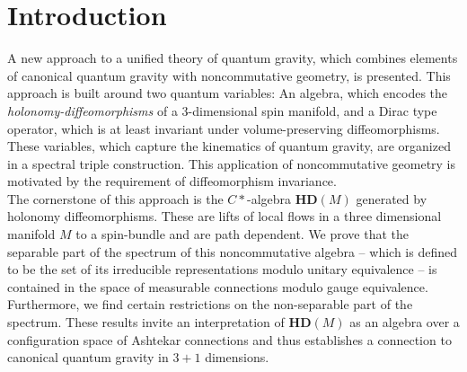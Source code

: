 \documentclass[12pt]{article}
\begin{document}
\newpage
\tableofcontents
\newpage

\section{Introduction}

A new approach to a unified theory of quantum gravity, which combines elements of canonical quantum gravity with noncommutative geometry, is presented. This approach is built around two quantum variables: An algebra, which encodes the {\it holonomy-diffeomorphisms} of a 3-dimensional spin manifold, and  a Dirac type operator, which is at least invariant under volume-preserving diffeomorphisms.
These variables, which capture the kinematics of quantum gravity, are organized in a spectral triple construction. This application of noncommutative geometry is motivated by the requirement of diffeomorphism invariance.\\
 



The cornerstone of this approach is
the $C*$-algebra $\mathbf{HD}(M) $  generated by {holonomy diffeomorphisms}. These are lifts of local flows in a three dimensional manifold $M$ to a spin-bundle and are path dependent. 
%
 We prove that the separable part of the spectrum  of this noncommutative algebra  --  which is defined to be the set of its irreducible representations modulo unitary equivalence  --  is contained in the space of measurable connections modulo gauge equivalence. Furthermore, we find certain restrictions on the non-separable part of the spectrum. These results invite an interpretation of $\mathbf{HD}(M) $ as an algebra over a configuration space of Ashtekar connections  \cite{Ashtekar:1986yd,Ashtekar:1987gu} and thus establishes a connection  to canonical quantum gravity in $3+1$ dimensions. 
\end{document}
